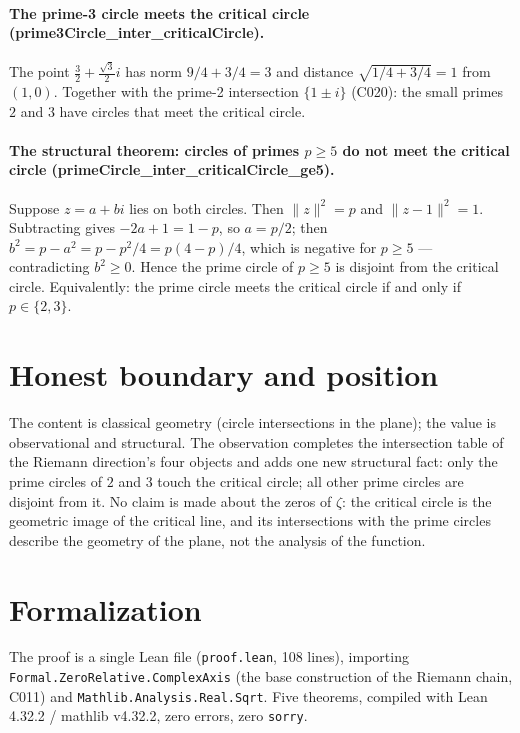 \documentclass[sigplan,10pt,anonymous,review]{acmart}
\begin{document}
\paragraph{The prime-3 circle meets the critical circle
(prime3Circle\_inter\_criticalCircle).} The point
$\frac32 + \frac{\sqrt{3}}{2} i$ has norm $9/4 + 3/4 = 3$ and distance
$\sqrt{1/4 + 3/4} = 1$ from $(1,0)$. Together with the prime-2
intersection $\{1 \pm i\}$ (C020): the small primes $2$ and $3$ have
circles that meet the critical circle.

\paragraph{The structural theorem: circles of primes $p \ge 5$ do not
meet the critical circle (primeCircle\_inter\_criticalCircle\_ge5).}
Suppose $z = a + bi$ lies on both circles. Then $\|z\|^2 = p$ and
$\|z - 1\|^2 = 1$. Subtracting gives $-2a + 1 = 1 - p$, so $a = p/2$;
then $b^2 = p - a^2 = p - p^2/4 = p(4-p)/4$, which is negative for
$p \ge 5$ --- contradicting $b^2 \ge 0$. Hence the prime circle of
$p \ge 5$ is disjoint from the critical circle. Equivalently: the prime
circle meets the critical circle if and only if $p \in \{2, 3\}$.

\section{Honest boundary and position}

The content is classical geometry (circle intersections in the plane);
the value is observational and structural. The observation completes the
intersection table of the Riemann direction's four objects and adds one
new structural fact: only the prime circles of $2$ and $3$ touch the
critical circle; all other prime circles are disjoint from it. No claim
is made about the zeros of $\zeta$: the critical circle is the geometric
image of the critical line, and its intersections with the prime circles
describe the geometry of the plane, not the analysis of the function.

\section{Formalization}

The proof is a single Lean file (\texttt{proof.lean}, 108 lines),
importing \texttt{Formal.ZeroRelative.ComplexAxis} (the base
construction of the Riemann chain, C011) and
\texttt{Mathlib.Analysis.Real.Sqrt}. Five theorems, compiled with Lean
4.32.2 / mathlib v4.32.2, zero errors, zero \texttt{sorry}.
\end{document}
